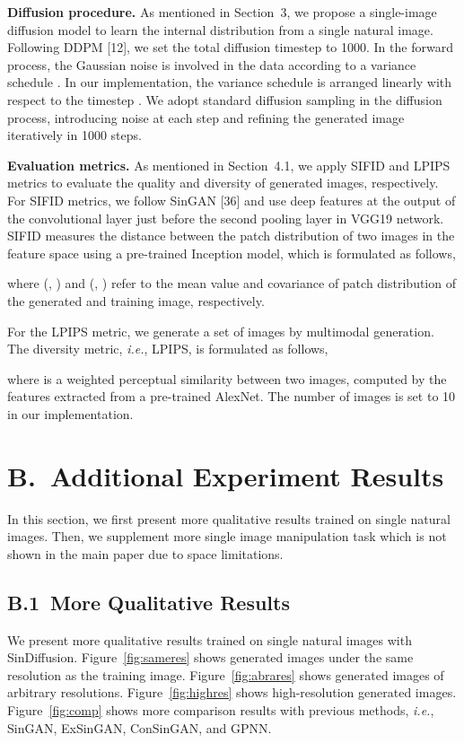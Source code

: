 \documentclass[10pt,twocolumn,letterpaper]{article}
\begin{document}
\vspace{2mm}
\noindent \textbf{Diffusion procedure.}
As mentioned in Section~3, we propose a single-image diffusion model to learn the internal distribution from a single natural image.
Following DDPM [12], we set the total diffusion timestep  to 1000.
In the forward process, the Gaussian noise is involved in the data according to a variance schedule .
In our implementation, the variance schedule is arranged linearly with respect to the timestep .
We adopt standard diffusion sampling in the diffusion process, introducing noise at each step and refining the generated image iteratively in 1000 steps.

\vspace{2mm}
\noindent \textbf{Evaluation metrics.}
As mentioned in Section~4.1, we apply SIFID and LPIPS metrics to evaluate the quality and diversity of generated images, respectively.
For SIFID metrics, we follow SinGAN [36] and use deep features at the output of the convolutional layer just before the second pooling layer in VGG19 network.
SIFID measures the distance between the patch distribution of two images in the feature space using a pre-trained Inception model, which is formulated as follows, 

where (, ) and (, ) refer to the mean value and covariance of patch distribution of the generated and training image, respectively.

For the LPIPS metric, we generate a set of images  by multimodal generation. 
The diversity metric, \emph{i.e.}, LPIPS, is formulated as follows,

where  is a weighted perceptual similarity between two images, computed by the features extracted from a pre-trained AlexNet.
The number of images  is set to 10 in our implementation.

\section*{B.~Additional Experiment Results}
In this section, we first present more qualitative results trained on single natural images.
Then, we supplement more single image manipulation task which is not shown in the main paper due to space limitations.

\subsection*{B.1~More Qualitative Results}
We present more qualitative results trained on single natural images with SinDiffusion.
Figure~\ref{fig:sameres} shows generated images under the same resolution as the training image.
Figure~\ref{fig:abrares} shows generated images of arbitrary resolutions.
Figure~\ref{fig:highres} shows high-resolution generated images.
Figure~\ref{fig:comp} shows more comparison results with previous methods, \emph{i.e.}, SinGAN, ExSinGAN, ConSinGAN, and GPNN.
\end{document}
